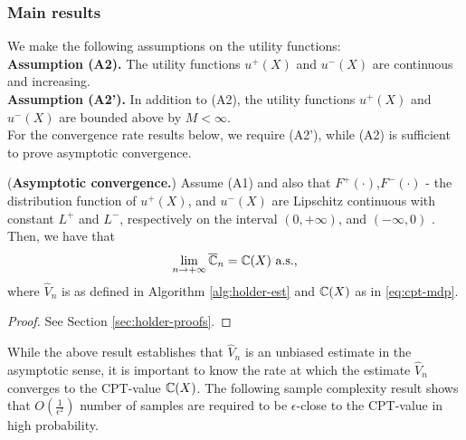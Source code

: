 \documentclass[11pt,letterpaper,english]{article}
\begin{document}
\subsubsection*{Main results}
We make the following assumptions on the utility functions:\\[1ex]
\textbf{Assumption (A2).}  The utility functions $u^+(X)$ and $u^-(X)$ are continuous and increasing.\\[1ex]
\textbf{Assumption (A2').}  In addition to (A2), the utility functions $u^+(X)$ and $u^-(X)$ are bounded above by $M<\infty$.\\[1ex]
For the convergence rate results below, we require (A2'), while (A2) is sufficient to prove asymptotic convergence.

\begin{proposition}(\textbf{Asymptotic convergence.})
\label{prop:holder-asymptotic}
Assume (A1) and also that $F^+(\cdot)$,$F^-(\cdot)$ - the distribution function of $u^+(X)$, and $u^-(X)$ are Lipschitz continuous with constant $L^+$ and $L^-$, respectively on the interval $(0,+\infty)$, and 
$(-\infty, 0)$ . Then, we have that
\begin{align}
\lim_{n\rightarrow +\infty} 
\overline {\mathbb{C}}_n
=
\mathbb{C}(X)
 \text{   a.s.,}
\end{align}
where $\hat V_n$ is as defined in Algorithm \ref{alg:holder-est} and $\mathbb{C}(X)$ as in \eqref{eq:cpt-mdp}.
\end{proposition}
\begin{proof}
See Section \ref{sec:holder-proofs}.
\end{proof}

While the above result establishes that $\hat V_n$ is an unbiased estimate in the asymptotic sense, it is important to know the rate at which the estimate $\hat V_n$ converges to the CPT-value $\mathbb{C}(X)$. 
The following sample complexity result shows that $O\left(\frac{1}{\epsilon^2}\right)$ number of samples are required to be $\epsilon$-close to the CPT-value in high probability.

% 
\end{document}

